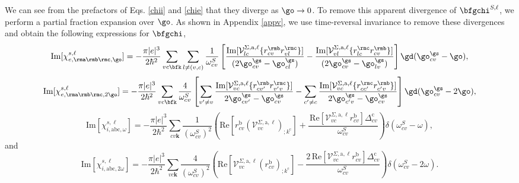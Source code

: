 \documentclass[floatfix,prb,aps,superscriptaddress,11pt,preprint,letterpaper]{revtex4}
\begin{document}
We can see from the prefactors of Eqs. \eqref{chii} and \eqref{chie} 
that they diverge as $\go\to 0$. To remove this apparent divergence of 
$\bfgchi^{S,\ell}$, we perform a partial fraction expansion over $\go$. 
As shown in Appendix \ref{appv}, we use time-reversal invariance to 
remove these divergences and obtain the following expressions for $\bfgchi$,
\begin{equation}\label{calvimchiewn}
\mathrm{Im}[\chi_{e,\rma\rmb\rmc,\go}^{s,\ell}] =
-\frac{\pi |e|^3}{2\hbar^2}\sum_{vc\bfk}\sum_{l\neq(v,c)}\frac{1}{\omega^{S}_{cv}}
\left[
\frac{\mathrm{Im}[\mathcal{V}^{\Sigma,\text{a},\ell}_{lc}\{r^{\rmb}_{cv}r^{\rmc}_{vl}\}]}
{(2\go^\gs_{cv}-\go^\gs_{cl})} 
-\frac{\mathrm{Im}[\mathcal{V}^{\Sigma,\text{a},\ell}_{vl}\{r^{\rmc}_{lc}r^{\rmb}_{cv}\}]}
{(2\go^\gs_{cv}-\go^\gs_{lv})}
\right]\gd(\go^\gs_{cv}-\go),
\end{equation}  
\begin{equation}\label{calvimchie2wn}
\mathrm{Im}[\chi_{e,\rma\rmb\rmc,2\go}^{s,\ell}] =
-\frac{\pi |e|^3}{2\hbar^2}\sum_{vc\bfk}\frac{4}{\omega^{S}_{cv}}
\left[
\sum_{v'\ne
  v}\frac{\mathrm{Im}[\mathcal{V}^{\Sigma,\text{a},\ell}_{vc}\{r^{\rmb}_{cv'}r^{\rmc}_{v'v}\}]}
{2\go^\gs_{cv'}-\go^\gs_{cv}}
- \sum_{c'\ne
  c}\frac{\mathrm{Im}[\mathcal{V}^{\Sigma,\text{a},\ell}_{vc}\{r^{\rmc}_{cc'}r^{\rmb}_{c'v}\}]}
{2\go^\gs_{c'v}-\go^\gs_{cv}}
\right]\gd(\go^\gs_{cv}-2\go),
\end{equation}
\begin{equation}\label{calvimchiwn}
\mathrm{Im}[\chi_{i,\text{a}\text{b}\text{c},\omega}^{s,\ell}]
= -\frac{\pi\vert e\vert^3}{2\hbar^2}\sum_{cv\mathbf{k}}\frac{1}{(\omega^{S}_{cv})^{2}}
\left(
\mathrm{Re}\left[r^{\text{b}}_{cv}\left(\mathcal{V}^{\Sigma,\text{a},\ell}_{vc}\right)_{;k^{\text{c}}}\right]
+\frac{\,\mathrm{Re}\left[\mathcal{V}^{\Sigma,\text{a},\ell}_{vc}r^{\text{b}}_{cv}\right]
\Delta^{\text{c}}_{cv}}{\omega^{S}_{cv}} 
\right)\delta(\omega^{S}_{cv}-\omega),
\end{equation}
and
\begin{equation}\label{calvimchi2wn}
\mathrm{Im}[\chi_{i,\text{a}\text{b}\text{c},2\omega}^{s,\ell}] 
=
 -\frac{\pi \vert
   e\vert^{3}}{2\hbar^2}\sum_{vc\mathbf{k}}\frac{4}{(\omega^{S}_{cv})^{2}}
\left(\mathrm{Re}\left[\mathcal{V}^{\Sigma,\text{a},\ell}_{vc}\left(r^{\text{b}}_{cv}\right)_{;k^{\text{c}}}
\right] -
\frac{2\,\mathrm{Re}\left[\mathcal{V}^{\Sigma,\text{a},\ell}_{vc}r^{\text{b}}_{cv}\right]
\Delta^{\text{c}}_{cv}}{\omega^{S}_{cv}}\right)\delta(\omega^{S}_{cv}-2\omega).
\end{equation}
\end{document}
